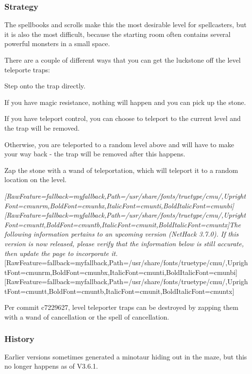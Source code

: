 \subsubsection{Strategy}
\label{5}
The spellbooks and scrolls make this the most desirable level for spellcasters, but it is also the most difficult, because the starting room often contains several powerful monsters in a small space.

There are a couple of different ways that you can get the luckstone off the level teleporte traps:

\begin{myitemize}\item{}Step onto the trap directly.

\begin{myitemize}\item{}If you have magic resistance, nothing will happen and you can pick up the stone.
\item{}If you have teleport control, you can choose to teleport to the current level and the trap will be removed.
\item{}Otherwise, you are teleported to a random level above and will have to make your way back -{} the trap will be removed after this happens.
\end{myitemize}

\item{}Zap the stone with a wand of teleportation, which will teleport it to a random location on the level.
\end{myitemize}

{\itshape \allowbreak{}\setmainfont{cmunti.ttf}[RawFeature={fallback=myfallback},Path=/usr/share/fonts/truetype/cmu/,UprightFont=cmunrm,BoldFont=cmunbx,ItalicFont=cmunti,BoldItalicFont=cmunbi]\setmonofont{cmunti.ttf}[RawFeature={fallback=myfallback},Path=/usr/share/fonts/truetype/cmu/,UprightFont=cmuntt,BoldFont=cmuntb,ItalicFont=cmunit,BoldItalicFont=cmuntx]\itshape The following information pertains to an upcoming version (NetHack 3.7.0\footnotemark[126]). If this version is now released, please verify that the information below is still accurate, then update the page to incorporate it.}\allowbreak{}\setmainfont{cmunrm.ttf}[RawFeature={fallback=myfallback},Path=/usr/share/fonts/truetype/cmu/,UprightFont=cmunrm,BoldFont=cmunbx,ItalicFont=cmunti,BoldItalicFont=cmunbi]\setmonofont{cmunrm.ttf}[RawFeature={fallback=myfallback},Path=/usr/share/fonts/truetype/cmu/,UprightFont=cmuntt,BoldFont=cmuntb,ItalicFont=cmunit,BoldItalicFont=cmuntx]

Per commit c7229627, level teleporter traps can be destroyed by zapping them with a wand of cancellation or the spell of cancellation.
\subsubsection{History}
\label{6}
Earlier versions sometimes generated a minotaur hiding out in the maze, but this no longer happens as of V3.6.1.
